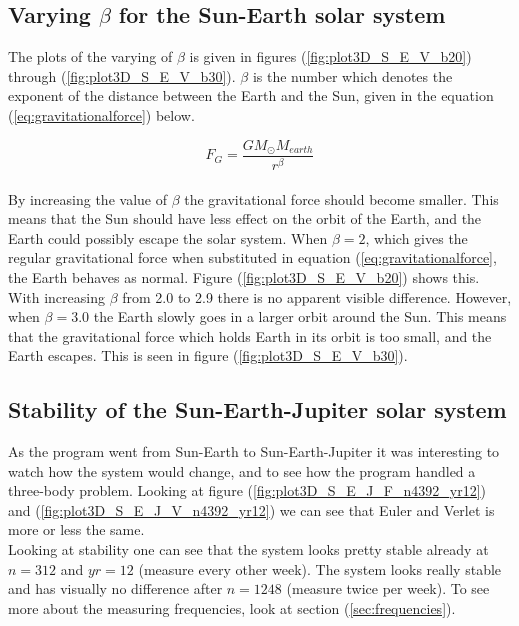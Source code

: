 \documentclass{article}
\begin{document}
\subsection{Varying \texorpdfstring{$\beta$}{TEXT} for the Sun-Earth solar system}    \label{sec:betaSE}

    The plots of the varying of $\beta$ is given in figures (\ref{fig:plot3D_S_E_V_b20}) through (\ref{fig:plot3D_S_E_V_b30}). $\beta$ is the number which denotes the exponent of the distance between the Earth and the Sun, given in the equation (\ref{eq:gravitationalforce}) below.

    \begin{equation}    \label{eq:gravitationalforce}
        F_G = \frac{G M_\odot M_{earth}}{r^\beta}
    \end{equation} \\

    By increasing the value of $\beta$ the gravitational force should become smaller. This means that the Sun should have less effect on the orbit of the Earth, and the Earth could possibly escape the solar system. When $\beta = 2$, which gives the regular gravitational force when substituted in equation (\ref{eq:gravitationalforce}, the Earth behaves as normal. Figure (\ref{fig:plot3D_S_E_V_b20}) shows this. With increasing $\beta$ from 2.0 to 2.9 there is no apparent visible difference. However, when $\beta = 3.0$ the Earth slowly goes in a larger orbit around the Sun. This means that the gravitational force which holds Earth in its orbit is too small, and the Earth escapes. This is seen in figure (\ref{fig:plot3D_S_E_V_b30}). \\

\subsection{Stability of the Sun-Earth-Jupiter solar system}    \label{sec:stabilitySEJ}

    As the program went from Sun-Earth to Sun-Earth-Jupiter it was interesting to watch how the system would change, and to see how the program handled a three-body problem. Looking at figure (\ref{fig:plot3D_S_E_J_F_n4392_yr12}) and (\ref{fig:plot3D_S_E_J_V_n4392_yr12}) we can see that Euler and Verlet is more or less the same.\\

    Looking at stability one can see that the system looks pretty stable already at $n=312$ and $yr=12$ (measure every other week). The system looks really stable and has visually no difference after $n=1248$ (measure twice per week). To see more about the measuring frequencies, look at section (\ref{sec:frequencies}).\\
\end{document}
